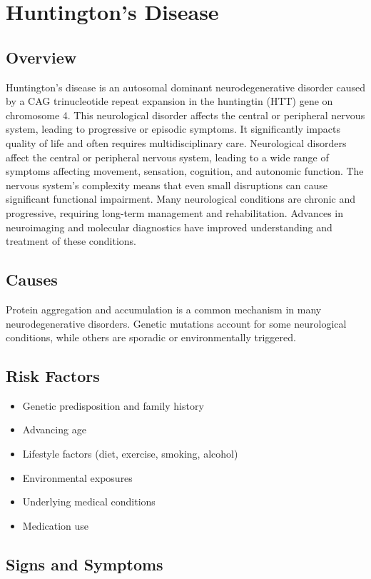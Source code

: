 \chapter{Huntington's Disease}
\label{sec:Huntington's Disease}

\section{Overview}
Huntington's disease is an autosomal dominant neurodegenerative disorder caused by a CAG trinucleotide repeat expansion in the huntingtin (HTT) gene on chromosome 4. This neurological disorder affects the central or peripheral nervous system, leading to progressive or episodic symptoms. It significantly impacts quality of life and often requires multidisciplinary care. Neurological disorders affect the central or peripheral nervous system, leading to a wide range of symptoms affecting movement, sensation, cognition, and autonomic function. The nervous system's complexity means that even small disruptions can cause significant functional impairment. Many neurological conditions are chronic and progressive, requiring long-term management and rehabilitation. Advances in neuroimaging and molecular diagnostics have improved understanding and treatment of these conditions.
\section{Causes}
Protein aggregation and accumulation is a common mechanism in many neurodegenerative disorders.  Genetic mutations account for some neurological conditions, while others are sporadic or environmentally triggered.   
\section{Risk Factors}
\begin{itemize}[noitemsep]
  \item Genetic predisposition and family history
  \item Advancing age
  \item Lifestyle factors (diet, exercise, smoking, alcohol)
  \item Environmental exposures
  \item Underlying medical conditions
  \item Medication use
\end{itemize}
\section{Signs and Symptoms}

